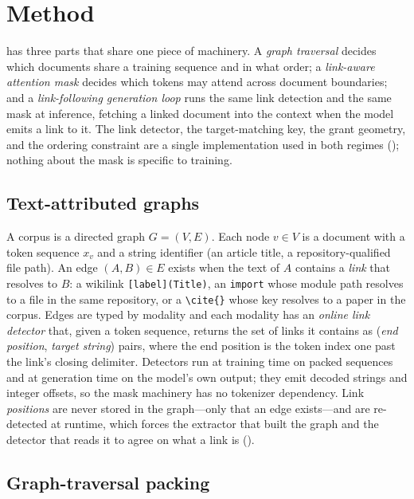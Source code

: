 \section{Method}
\label{sec:method}

\method has three parts that share one piece of machinery. A \emph{graph traversal}
decides which documents share a training sequence and in what order; a
\emph{link-aware attention mask} decides which tokens may attend across document
boundaries; and a \emph{link-following generation loop} runs the same link detection
and the same mask at inference, fetching a linked document into the context when the
model emits a link to it. The link detector, the target-matching key, the grant
geometry, and the ordering constraint are a single implementation used in both
regimes (); nothing about the mask is specific to training.

\subsection{Text-attributed graphs}
\label{sec:method:tag}

A corpus is a directed graph $G=(V,E)$. Each node $v\in V$ is a document with a
token sequence $x_v$ and a string identifier (an article title, a
repository-qualified file path). An edge $(A,B)\in E$ exists when the text of $A$
contains a \emph{link} that resolves to $B$: a wikilink \texttt{[label](Title)}, an
\texttt{import} whose module path resolves to a file in the same repository, or a
\texttt{\textbackslash cite\{\}} whose key resolves to a paper in the corpus. Edges are
typed by modality and each modality has an \emph{online link detector} that, given a
token sequence, returns the set of links it contains as (\emph{end position},
\emph{target string}) pairs, where the end position is the token index one past the
link's closing delimiter. Detectors run at training time on packed sequences and at
generation time on the model's own output; they emit decoded strings and integer
offsets, so the mask machinery has no tokenizer dependency. Link \emph{positions} are
never stored in the graph---only that an edge exists---and are re-detected at runtime,
which forces the extractor that built the graph and the detector that reads it to
agree on what a link is ().

\subsection{Graph-traversal packing}
\label{sec:method:packing}

